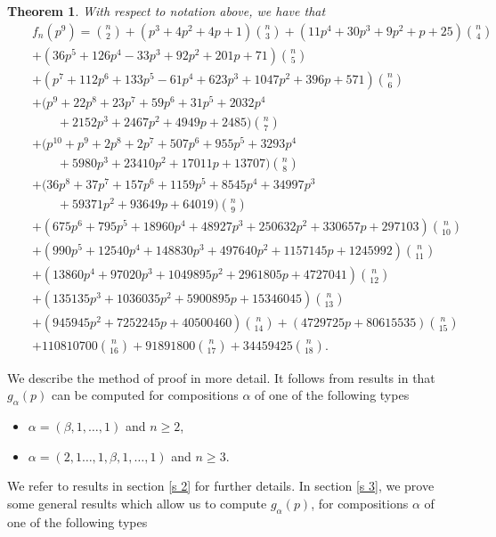 \documentclass[a4paper]{amsart}
\newtheorem{theorem}{Theorem}[section]
\numberwithin{equation}{section}
\theoremstyle{remark}
\begin{document}
 \begin{theorem}\label{main}
With respect to notation above, we have that
\begin{eqnarray*}
& & f_n(p^9) ={n \choose 2} + (p^3 + 4p^2 + 4p + 1){n \choose 3} + (11p^4 + 30p^3 + 9p^2 + p + 25){n \choose 4} \\
& & + (36p^5 + 126p^4 - 33p^3 + 92p^2 + 201p + 71){n \choose 5} \\
& & + (p^7 + 112p^6 + 133p^5 - 61p^4 + 623p^3 + 1047p^2 + 396p + 571){n \choose 6} \\
& & + (p^9 + 22p^8 + 23p^7 + 59p^6 + 31p^5 + 2032p^4\\
& & \hspace{2em} +2152p^3 + 2467p^2 + 4949p+ 2485){n \choose 7}\\
& & + (p^{10} + p^9 + 2p^8 + 2p^7 + 507p^6 + 955p^5 + 3293p^4\\
& & \hspace{2em} + 5980p^3 + 23410p^2+ 17011p + 13707){n \choose 8}\\
& & + (36p^8 + 37p^7 + 157p^6 + 1159p^5 + 8545p^4 + 34997p^3\\
& & \hspace{2em} + 59371p^2 + 93649p+ 64019){n \choose 9}\\
& & + (675p^6 + 795p^5 + 18960p^4 + 48927p^3 + 250632p^2 + 330657p+ 297103){n \choose 10}\\
& & + (990p^5 + 12540p^4 + 148830p^3 + 497640p^2 + 1157145p + 1245992){n \choose 11}\\
& & + (13860p^4 + 97020p^3 + 1049895p^2 + 2961805p + 4727041){n \choose 12}\\
& & + (135135p^3 + 1036035p^2 + 5900895p + 15346045){n \choose 13}\\
& & + (945945p^2 + 7252245p + 40500460){n \choose 14} + (4729725p + 80615535){n \choose 15}\\
& & + 110810700{n \choose 16} + 91891800{n \choose 17} + 34459425{n \choose 18}.
\end{eqnarray*}
\end{theorem}
\par We describe the method of proof in more detail. It follows from results in \cite{liu2007counting,atanasov2021counting} that $g_\alpha(p)$ can be computed for compositions $\alpha$ of one of the following types 
 \begin{itemize}
 \item $\alpha=(\beta, 1, \dots, 1)$ and $n\geq 2$, 
 \item $\alpha=(2,1\dots, 1, \beta, 1, \dots, 1)$ and $n\geq 3$. 
 \end{itemize}We refer to results in section \ref{s 2} for further details. In section \ref{s 3}, we prove some general results which allow us to compute $g_\alpha(p)$, for compositions $\alpha$ of one of the following types
\end{document}
